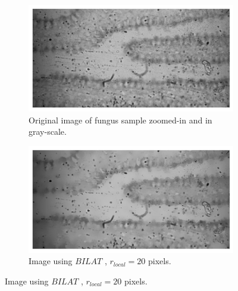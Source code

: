 \begin{figure}[h!]
	
    \begin{subfigure}[b]{0.4\textwidth}
        \centering
        \includegraphics[width=\textwidth, frame]{afbeeldingen/rank/img.png}
        \caption{Original image of fungus sample zoomed-in and in gray-scale.}   
        \label{fig_rank_plain}
    \end{subfigure}
    \hspace*{\fill}
    \begin{subfigure}[b]{0.4\textwidth}
        \centering
        \includegraphics[width=\textwidth, frame]{afbeeldingen/rank/img_bilat.png}
        \caption{Image using $BILAT$ , $r_{local}=20$ pixels.}   
        \label{fig_rank_bilat}
    \end{subfigure}
    

\end{figure}
